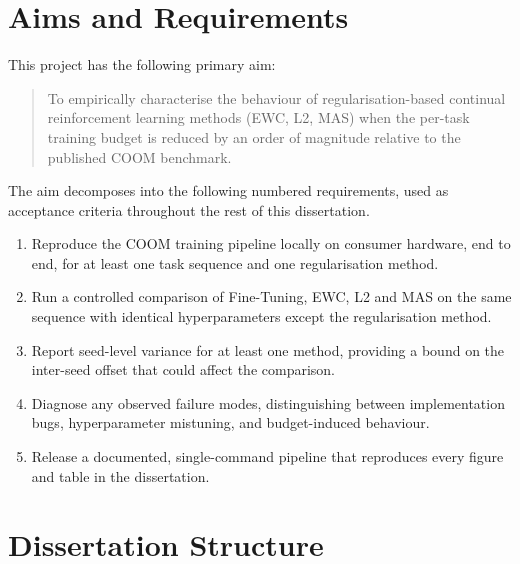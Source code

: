 \section{Aims and Requirements}
\label{sec:aims}

This project has the following primary aim:
\begin{quote}
    To empirically characterise the behaviour of regularisation-based
    continual reinforcement learning methods (EWC, L2, MAS) when the
    per-task training budget is reduced by an order of magnitude relative
    to the published COOM benchmark.
\end{quote}

The aim decomposes into the following numbered requirements, used as
acceptance criteria throughout the rest of this dissertation.

\begin{enumerate}[label=\textbf{R\arabic*.},leftmargin=2.4em]
    \item \label{req:pipeline}
        Reproduce the COOM training pipeline locally on consumer
        hardware, end to end, for at least one task sequence and one
        regularisation method.
    \item \label{req:multimethod}
        Run a controlled comparison of Fine-Tuning, EWC, L2 and MAS on
        the same sequence with identical hyperparameters except the
        regularisation method.
    \item \label{req:variance}
        Report seed-level variance for at least one method, providing a
        bound on the inter-seed offset that could affect the comparison.
    \item \label{req:diagnose}
        Diagnose any observed failure modes, distinguishing between
        implementation bugs, hyperparameter mistuning, and
        budget-induced behaviour.
    \item \label{req:reproduce}
        Release a documented, single-command pipeline that reproduces
        every figure and table in the dissertation.
\end{enumerate}

\section{Dissertation Structure}
\label{sec:structure}

